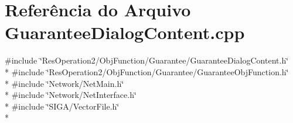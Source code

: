 \section{Referência do Arquivo Guarantee\+Dialog\+Content.\+cpp}
\label{_2_obj_function_2_guarantee_2_guarantee_dialog_content_8cpp}
{\ttfamily \#include \char`\"{}Res\+Operation2/\+Obj\+Function/\+Guarantee/\+Guarantee\+Dialog\+Content.\+h\char`\"{}}\\*
{\ttfamily \#include \char`\"{}Res\+Operation2/\+Obj\+Function/\+Guarantee/\+Guarantee\+Obj\+Function.\+h\char`\"{}}\\*
{\ttfamily \#include \char`\"{}Network/\+Net\+Main.\+h\char`\"{}}\\*
{\ttfamily \#include \char`\"{}Network/\+Net\+Interface.\+h\char`\"{}}\\*
{\ttfamily \#include \char`\"{}S\+I\+G\+A/\+Vector\+File.\+h\char`\"{}}\\*
